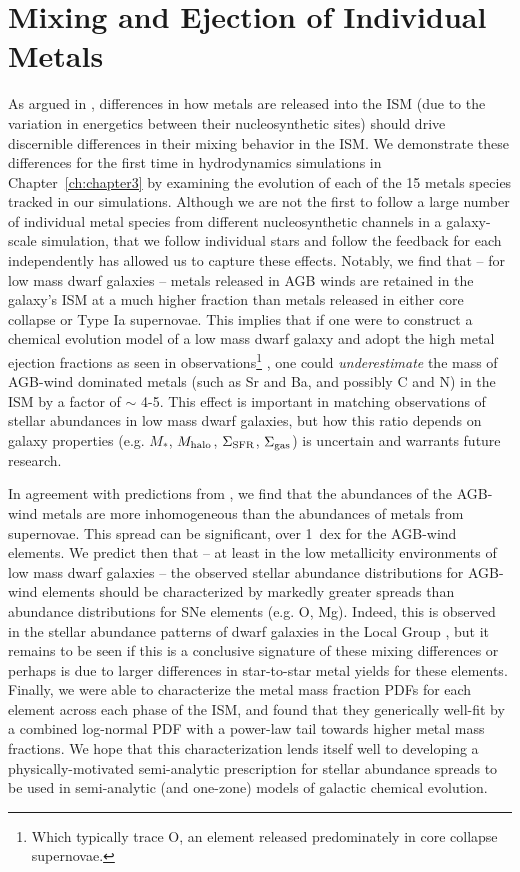 \section{Mixing and Ejection of Individual Metals}
\label{conclusion:sec:ch3}

As argued in \cite{KrumholzTing2018}, differences in how metals are released into the ISM (due to the variation in energetics between their nucleosynthetic sites) should drive discernible differences in their mixing behavior in the ISM. We demonstrate these differences for the first time in hydrodynamics simulations in Chapter~\ref{ch:chapter3} by examining the evolution of each of the 15 metals species tracked in our simulations. Although we are not the first to follow a large number of individual metal species from different nucleosynthetic channels in a galaxy-scale simulation, that we follow individual stars and follow the feedback for each independently has allowed us to capture these effects. Notably, we find that -- for low mass dwarf galaxies -- metals released in AGB winds are retained in the galaxy's ISM at a much higher fraction than metals released in either core collapse or Type Ia supernovae. This implies that if one were to construct a chemical evolution model of a low mass dwarf galaxy and adopt the high metal ejection fractions as seen in observations\footnote{Which typically trace O, an element released predominately in core collapse supernovae.} \citep{Kirby2011-metals,McQuinn2015}, one could \textit{underestimate} the mass of AGB-wind dominated metals (such as Sr and Ba, and possibly C and N) in the ISM by a factor of $\sim$ 4-5. This effect is important in matching observations of stellar abundances in low mass dwarf galaxies, but how this ratio depends on galaxy properties (e.g. $M_*$, $M_{\rm halo}$, $\Sigma_{\rm SFR}$, $\Sigma_{\rm gas}$) is uncertain and warrants future research.

In agreement with predictions from \cite{KrumholzTing2018}, we find that the abundances of the AGB-wind metals are more inhomogeneous than the abundances of metals from supernovae. This spread can be significant, over 1~dex for the AGB-wind elements. We predict then that -- at least in the low metallicity environments of low mass dwarf galaxies -- the observed stellar abundance distributions for AGB-wind elements should be characterized by markedly greater spreads than abundance distributions for SNe elements (e.g. O, Mg). Indeed, this is observed in the stellar abundance patterns of dwarf galaxies in the Local Group \citep{Suda2017}, but it remains to be seen if this is a conclusive signature of these mixing differences or perhaps is due to larger differences in star-to-star metal yields for these elements. Finally, we were able to characterize the metal mass fraction PDFs for each element across each phase of the ISM, and found that they generically well-fit by a combined log-normal PDF with a power-law tail towards higher metal mass fractions. We hope that this characterization lends itself well to developing a physically-motivated semi-analytic prescription for stellar abundance spreads to be used in semi-analytic (and one-zone) models of galactic chemical evolution.

